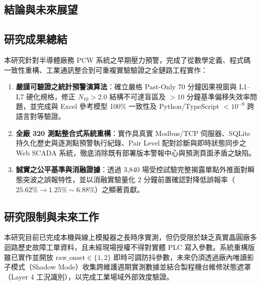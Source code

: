 \documentclass[fontset=none, a4paper, 12pt]{ctexart}
\begin{document}
\begin{doublespace}
\clearpage
\section{結論與未來展望}

\subsection{研究成果總結}
本研究針對半導體廠務 PCW 系統之早期壓力預警，完成了從數學定義、程式碼一致性重構、工業通訊整合到可重複實驗驗證之全鏈路工程實作：
\begin{enumerate}
    \item \textbf{嚴謹可驗證之統計預警演算法}：確立嚴格 Past-Only 70 分鐘因果視窗與 L1–L7 硬化規格，修正 $N_{10}>2.0$ 結構不可達盲區及 $>10$ 分鐘基準偏移失效率問題，並完成與 Excel 參考模型 100\% 一致性及 Python/TypeScript $<10^{-9}$ 跨語言對等驗證。
    \item \textbf{全廠 320 測點整合式系統重構}：實作具真實 Modbus/TCP 伺服器、SQLite 持久化歷史與逐測點預警執行紀錄、Pair Level 配對診斷與即時狀態同步之 Web SCADA 系統，徹底消除既有部署版本警報中心與預測頁面矛盾之缺陷。
    \item \textbf{誠實之公平基準與消融證據}：透過 3,840 場受控試驗完整揭露單點外推面對瞬態突波之誤報特性，並以消融實驗量化 2 分鐘前置確認對降低誤報率（$25.62\% \to 1.25\%\sim 6.88\%$）之顯著貢獻。
\end{enumerate}

\subsection{研究限制與未來工作}
本研究目前已完成本機與線上模擬器之長時序實測，但仍受限於缺乏真實晶圓廠多迴路歷史故障工單資料，且未經現場授權不得對實體 PLC 寫入參數。系統重構版雖已實作並開放 $\text{raw\_onset} \in \{1, 2\}$ 即時可調防抖參數，未來仍須透過廠內唯讀影子模式（Shadow Mode）收集跨維護週期實測數據並結合製程機台維修狀態遮罩（Layer 4 工況識別），以完成工業場域外部效度驗證。


\end{doublespace}
\end{document}
